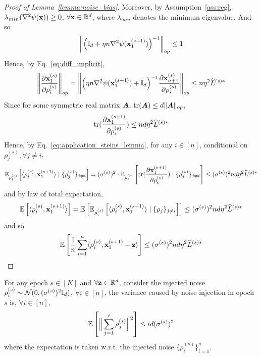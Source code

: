 \begin{proof}[Proof of Lemma~\ref{lemma:noise_bias}]
    Moreover, by Assumption~\ref{ass:reg}, $\lambda_{min}(\nabla^2 \psi({\mathbf{x}})) \geq 0$, $\forall {\mathbf{x}} \in \mathbb{R}^d$, 
    where $\lambda_{min}$ denotes the minimum eigenvalue. And so
    \begin{align}
        \left\| \Big({\mathbb{I}}_d + \eta n \nabla^2 \psi({\mathbf{x}}_1^{(s+1)})\Big)^{-1} \right\|_{op} 
        \leq 1
    \end{align}
    Hence, by Eq.~\ref{eq:diff_implicit}, 
    \begin{align}
        \left\| \frac{\partial {\mathbf{x}}_{1}^{(s)}}{\partial \rho_i^{(s)}} \right\|_{op} 
        = \left\| \Big(\eta n \nabla^2 \psi({\mathbf{x}}_1^{(s+1)}) + {\mathbb{I}}_d \Big)^{-1} \frac{\partial {\mathbf{x}}_{n+1}^{(s)}}{\partial \rho_i^{(s)}} \right\|_{op}
        \leq n\eta^2 \widehat{L}^{(s)*}
    \end{align}
    Since for some symmetric real matrix ${\bm{A}}$, $\text{tr}({\bm{A}}) \leq d \|{\bm{A}}\|_{op}$, 
    \begin{align}
        \text{tr}(\frac{\partial {\mathbf{x}}_{1}^{(s+1)}}{\partial \rho_i^{(s)}})
        \leq nd \eta^2 \widehat{L}^{(s)*}
    \end{align}
    Hence, by Eq.~\ref{eq:application_steins_lemma}, for any $i\in [n]$, conditional on $\rho_j^{(s)}, \forall j\neq i$,
    \begin{align}
        \mathbb{E}_{\rho_i^{(s)}}\left[ \langle \rho_i^{(s)}, {\mathbf{x}}_{1}^{(s+1)} \rangle \mid\{\rho_j^{(s)}\}_{j\neq i} \right]
        = (\sigma^{(s)})^2\cdot \mathbb{E}_{\rho_i^{(s)}}\left[\text{tr}(\frac{\partial {\mathbf{x}}_1^{(s+1)}}{\partial \rho_i^{(s)}}) \mid\{\rho_j^{(s)}\}_{j\neq i} \right]
        \leq (\sigma^{(s)})^2 nd \eta^2 \widehat{L}^{(s)*}
    \end{align}
    and by law of total expectation,
    \begin{align}
        \mathbb{E}\left[\langle \rho_i^{(s)}, {\mathbf{x}}_1^{(s+1)}\rangle \right]
        = \mathbb{E}\left[ \mathbb{E}_{\rho_i^{(s)}}\left[ \langle \rho_i^{(s)}, {\mathbf{x}}_1^{(s+1)}\rangle \mid \{\rho_j\}_{j\neq i} \right] \right] 
        \leq (\sigma^{(s)})^2 nd \eta^2 \widehat{L}^{(s)*}
    \end{align}
    and so
    \begin{align}
        \mathbb{E}\left[\frac{1}{n}\sum_{i=1}^{n} \langle \rho_i^{(s)}, {\mathbf{x}}_1^{(s+1)} - {\mathbf{z}} \rangle \right]
        \leq (\sigma^{(s)})^2 nd \eta^2 \widehat{L}^{(s)*}
    \end{align}
    
    
\end{proof}


\begin{lemma}
\label{lemma:noise_variance}
    For any epoch $s\in [K]$ and $\forall {\mathbf{z}} \in \mathbb{R}^d$, consider the injected noise $\rho_i^{(s)} \sim {\mathcal{N}}(0, (\sigma^{(s)})^2 {\mathbb{I}}_d)$, $\forall i\in [n]$, the variance caused by noise injection in epoch $s$ is, $\forall i\in [n]$,
    \begin{align}
        \mathbb{E}\left[\Big\| \sum_{j=1}^{i} \rho_j^{(s)}\Big\|^2\right]
        \leq id (\sigma^{(s)})^2
    \end{align}
    where the expectation is taken w.r.t. the injected noise $\{\rho_i^{(s)}\}_{i=1}^{n}$.
\end{lemma}


